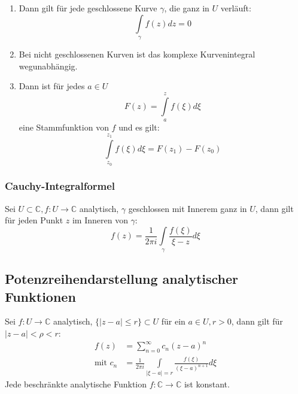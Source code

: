 \documentclass[a4paper,twocolumn,10pt]{article}
\begin{document}
\begin{enumerate}[label=$\bullet$]
\item Dann gilt für jede geschlossene Kurve $\gamma$, die ganz in $U$ verläuft:
\begin{equation*}
\int\limits_{\gamma}f(z)dz=0
\end{equation*}
\item Bei nicht geschlossenen Kurven ist das komplexe Kurvenintegral wegunabhängig.
\item Dann ist für jedes $a\in U$
\begin{equation*}
F(z)=\int\limits_a^zf(\xi)d\xi
\end{equation*}
eine Stammfunktion von $f$ und es gilt:
\begin{equation*}
\int\limits_{z_0}^{z_1}f(\xi)d\xi=F(z_1)-F(z_0)
\end{equation*}
\end{enumerate}

\subsubsection{Cauchy-Integralformel}
Sei $U\subset\mathbb{C},f:U\rightarrow\mathbb{C}$ analytisch, $\gamma$ geschlossen mit Innerem ganz in $U$, dann gilt für jeden Punkt $z$ im Inneren von $\gamma$:
\begin{equation*}
f(z)=\frac{1}{2\pi i}\int\limits_{\gamma}\frac{f(\xi)}{\xi -z}d\xi
\end{equation*}

\subsection{Potenzreihendarstellung analytischer Funktionen}
Sei $f:U\rightarrow\mathbb{C}$ analytisch, $\{|z-a|\leq r\}\subset U$ für ein $a\in U,r>0$, dann gilt für $|z-a|<\rho<r$:
\begin{equation*}
\begin{split}
f(z)&=\sum\limits_{n=0}^{\infty}c_n(z-a)^n\\
\text{mit }c_n&=\frac{1}{2\pi i}\int\limits_{|\xi- a|=r}\frac{f(\xi)}{(\xi -a)^{n+1}}d\xi
\end{split}
\end{equation*}
Jede beschränkte analytische Funktion $f:\mathbb{C}\rightarrow\mathbb{C}$ ist konstant.
\end{document}

